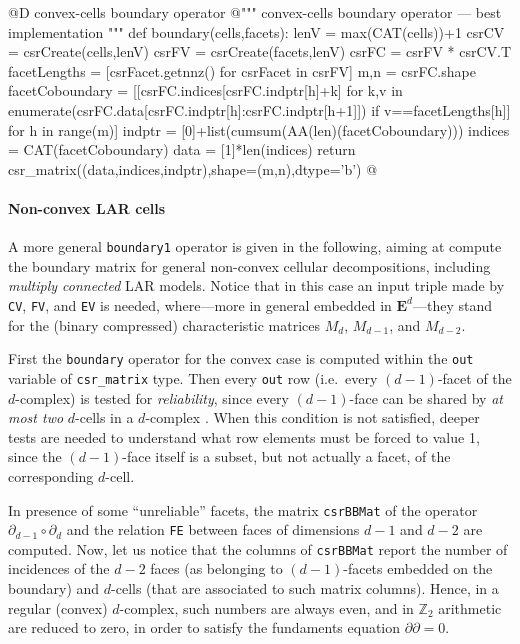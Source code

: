 \documentclass[11pt,oneside]{article}	%
\def\Z{\mathbb{Z}}
\begin{document}
@D convex-cells boundary operator
@{""" convex-cells boundary operator --- best implementation """
def boundary(cells,facets):
    lenV = max(CAT(cells))+1
    csrCV = csrCreate(cells,lenV)
    csrFV = csrCreate(facets,lenV)
    csrFC = csrFV * csrCV.T
    facetLengths = [csrFacet.getnnz() for csrFacet in csrFV]
    m,n = csrFC.shape
    facetCoboundary = [[csrFC.indices[csrFC.indptr[h]+k] 
        for k,v in enumerate(csrFC.data[csrFC.indptr[h]:csrFC.indptr[h+1]]) 
            if v==facetLengths[h]] for h in range(m)]
    indptr = [0]+list(cumsum(AA(len)(facetCoboundary)))
    indices = CAT(facetCoboundary)
    data = [1]*len(indices)
    return csr_matrix((data,indices,indptr),shape=(m,n),dtype='b')
@}


\paragraph{Non-convex LAR cells}

A more general \texttt{boundary1} operator is given in the following, aiming at compute the boundary matrix for general non-convex cellular decompositions, including \emph{multiply connected} LAR models.
Notice that in this case an input triple made by \texttt{CV}, \texttt{FV}, and \texttt{EV} is needed,
where---more in general embedded in $\mathbf{E}^d$---they stand for the (binary compressed) characteristic matrices $M_d$, $M_{d-1}$, and $M_{d-2}$.

First the \texttt{boundary} operator for the convex case is computed within the \texttt{out} variable of \texttt{csr\_matrix} type. Then every \texttt{out} row (i.e.~every $(d-1)$-facet of the $d$-complex) is tested for \emph{reliability}, since every $(d-1)$-face can be shared by \emph{at most two} $d$-cells in a $d$-complex . When this condition is not satisfied, deeper tests are needed to understand what row elements must be forced to value 1, since the $(d-1)$-face itself is a subset, but not actually a facet, of the corresponding $d$-cell. 

In presence of some ``unreliable'' facets, the matrix \texttt{csrBBMat} of the operator $\partial_{d-1}\circ\partial_d$ and the relation \texttt{FE} between faces of dimensions $d-1$ and $d-2$ are computed. Now, let us notice that the columns of \texttt{csrBBMat} report the number of incidences of the $d-2$ faces (as belonging to $(d-1)$-facets embedded on the boundary) and $d$-cells (that are associated to such matrix columns). Hence, in a regular (convex) $d$-complex, such numbers are always even, and in $\Z_2$ arithmetic are reduced to zero, in order to satisfy the fundaments equation $\partial\partial=0$. 
\end{document}
